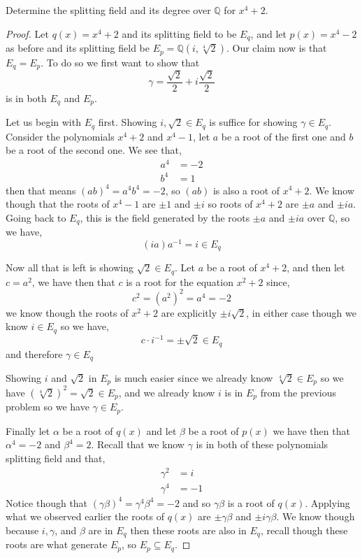 \documentclass[11pt]{article}
\newenvironment{problem}[2][Problem\!]{\begin{trivlist}
\item[\hskip \labelsep {\bfseries #1}\hskip \labelsep {\bfseries #2}]}{\end{trivlist}}
\newcommand{\qq}{\mathbb Q}   %
\begin{document}
\begin{problem}{13.4.2}
    Determine the splitting field and its degree over $\qq$ for $x^{4}+2$.
\end{problem}
\begin{example}
    \begin{proof}
        Let $q(x) = x^{4} + 2$ and its splitting field to be $E_q$, and let $p(x) = x^{4}-2$ as before and its splitting field be $E_p = \qq(i, \sqrt[4]{2})$. Our claim now is that $E_q = E_p$. To do so we first want to show that \[\gamma = \dfrac{\sqrt2}{2} + i \dfrac{\sqrt2}{2}\] is in both $E_q$ and $E_p$. 

        Let us begin with $E_q$ first. Showing $i, \sqrt2 \in E_q$ is suffice for showing $\gamma \in E_q$. Consider the polynomials $x^{4} + 2$ and $x^{4} - 1$, let $a$ be a root of the first one and $b$ be a root of the second one. We see that,
        \begin{align*}
            a^{4} &= -2 \\
            b^{4} &= 1 
        \end{align*} 
        then that means $(ab)^{4} = a^{4}b^{4} = -2$, so $(ab)$ is also a root of $x^{4}+ 2$. We know though that the roots of $x^{4} - 1$ are $\pm 1$ and $\pm i$ so roots of $x^{4} + 2$ are $\pm a $ and $\pm i a $. Going back to $E_q$, this is the field generated by the roots $\pm a $ and $\pm i a $ over $\qq$, so we have,
        \[(ia)a^{-1} = i \in E_q\]

        Now all that is left is showing $\sqrt2 \in E_q$. Let $a$ be a root of $x^{4} + 2$, and then let $c = a^{2}$, we have then that $c$ is a root for the equation $x^{2} + 2$ since,
        \[c^{2} = (a^{2})^{2} = a^{4} = - 2\]
        we know though the roots of $x^{2} + 2$ are explicitly $\pm i \sqrt{2}$, in either case though we know $i \in E_q$ so we have,
        \[c \cdot i^{-1} = \pm \sqrt2 \in E_q\]
        and therefore $\gamma \in E_q$

        Showing $i$ and $\sqrt2$ in $E_p$ is much easier since we already know $\sqrt[4]{2}\in E_p$ so we have $(\sqrt[4]{2})^{2} = \sqrt{2} \in E_p$, and we already know $i$ is in $E_p$ from the previous problem so we have $\gamma \in E_p$.

        Finally let $\alpha$ be a root of $q(x)$ and let $\beta$ be a root of $p(x)$ we have then that $\alpha^{4} = -2$ and $\beta^{4} = 2$. Recall that we know $\gamma$ is in both of these polynomials splitting field and that,
        \begin{align*}
            \gamma^{2} &= i \\
            \gamma^{4} &= -1
        \end{align*}
        Notice though that $(\gamma\beta)^{4} = \gamma^{4}\beta^{4} = -2$ and so $\gamma\beta$ is a root of $q(x)$. Applying what we observed earlier the roots of $q(x)$ are $\pm\gamma\beta$ and $\pm i \gamma \beta$. We know though because $i,\gamma$, and $\beta$ are in $E_q$ then these roots are also in $E_q$, recall though these roots are what generate $E_p$, so $E_p \subseteq E_q$.


\end{proof}
\end{example}
\end{document}
